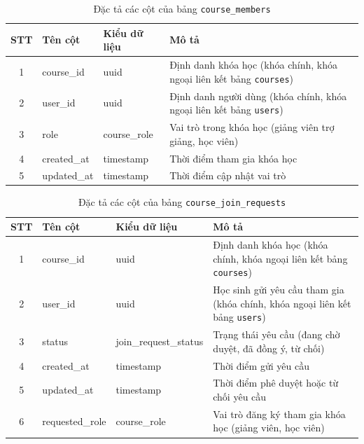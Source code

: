 \documentclass[../DoAn.tex]{subfiles}
\begin{document}
\begin{table}[H]
\centering
\small
\renewcommand{\arraystretch}{1.3}
\begin{tabular}{|c|l|l|p{6.2cm}|}
\hline
\textbf{STT} & \textbf{Tên cột} & \textbf{Kiểu dữ liệu} & \textbf{Mô tả} \\ \hline
1 & course\_id & uuid & Định danh khóa học (khóa chính, khóa ngoại liên kết bảng \texttt{courses}) \\ \hline
2 & user\_id & uuid & Định danh người dùng (khóa chính, khóa ngoại liên kết bảng \texttt{users}) \\ \hline
3 & role & course\_role & Vai trò trong khóa học (giảng viên trợ giảng, học viên) \\ \hline
4 & created\_at & timestamp & Thời điểm tham gia khóa học \\ \hline
5 & updated\_at & timestamp & Thời điểm cập nhật vai trò \\ \hline
\end{tabular}
\caption{Đặc tả các cột của bảng \texttt{course\_members}}
\label{tbl:course_members}
\end{table}

\begin{table}[H]
\centering
\small
\renewcommand{\arraystretch}{1.3}
\begin{tabular}{|c|l|l|p{6.2cm}|}
\hline
\textbf{STT} & \textbf{Tên cột} & \textbf{Kiểu dữ liệu} & \textbf{Mô tả} \\ \hline
1 & course\_id & uuid & Định danh khóa học (khóa chính, khóa ngoại liên kết bảng \texttt{courses}) \\ \hline
2 & user\_id & uuid & Học sinh gửi yêu cầu tham gia (khóa chính, khóa ngoại liên kết bảng \texttt{users}) \\ \hline
3 & status & join\_request\_status & Trạng thái yêu cầu (đang chờ duyệt, đã đồng ý, từ chối) \\ \hline
4 & created\_at & timestamp & Thời điểm gửi yêu cầu \\ \hline
5 & updated\_at & timestamp & Thời điểm phê duyệt hoặc từ chối yêu cầu \\ \hline
6 & requested\_role & course\_role & Vai trò đăng ký tham gia khóa học (giảng viên, học viên) \\ \hline
\end{tabular}
\caption{Đặc tả các cột của bảng \texttt{course\_join\_requests}}
\label{tbl:course_join_requests}
\end{table}
\end{document}
